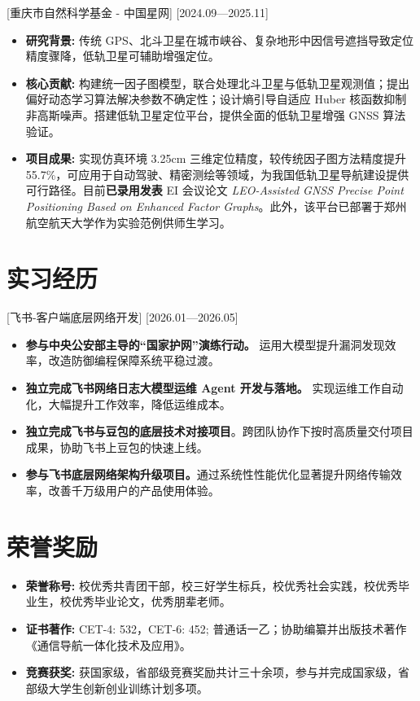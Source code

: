 \documentclass{resume}
\begin{document}
[重庆市自然科学基金 - 中国星网]
[2024.09—2025.11] 

\begin{itemize}
	\item \textbf{研究背景:} 传统 GPS、北斗卫星在城市峡谷、复杂地形中因信号遮挡导致定位精度骤降，低轨卫星可辅助增强定位。
	\item \textbf{核心贡献:} 构建统一因子图模型，联合处理北斗卫星与低轨卫星观测值；提出偏好动态学习算法解决参数不确定性；设计熵引导自适应 Huber 核函数抑制非高斯噪声。搭建低轨卫星定位平台，提供全面的低轨卫星增强 GNSS 算法验证。
	\item \textbf{项目成果:} 实现仿真环境 3.25cm 三维定位精度，较传统因子图方法精度提升 55.7\%，可应用于自动驾驶、精密测绘等领域，为我国低轨卫星导航建设提供可行路径。目前\textbf{已录用发表} EI 会议论文 \textit{LEO-Assisted GNSS Precise Point Positioning Based on Enhanced Factor Graphs}。此外，该平台已部署于郑州航空航天大学作为实验范例供师生学习。
\end{itemize}


\section{实习经历}
[飞书-客户端底层网络开发]
[2026.01—2026.05] 

\begin{itemize}
	\item \textbf{参与中央公安部主导的“国家护网”演练行动。} 运用大模型提升漏洞发现效率，改造防御编程保障系统平稳过渡。
	\item \textbf{独立完成飞书网络日志大模型运维 Agent 开发与落地。} 实现运维工作自动化，大幅提升工作效率，降低运维成本。
	\item \textbf{独立完成飞书与豆包的底层技术对接项目}。跨团队协作下按时高质量交付项目成果，协助飞书上豆包的快速上线。
	\item \textbf{参与飞书底层网络架构升级项目。}通过系统性性能优化显著提升网络传输效率，改善千万级用户的产品使用体验。	
\end{itemize}


\section{荣誉奖励}
\begin{itemize}
	\item \textbf{荣誉称号:} 校优秀共青团干部，校三好学生标兵，校优秀社会实践，校优秀毕业生，校优秀毕业论文，优秀朋辈老师。
	\item \textbf{证书著作:} CET-4: 532，CET-6: 452; 普通话一乙；协助编纂并出版技术著作《通信导航一体化技术及应用》。
	\item \textbf{竞赛获奖:} 获国家级，省部级竞赛奖励共计三十余项，参与并完成国家级，省部级大学生创新创业训练计划多项。
\end{itemize}
\end{document}
